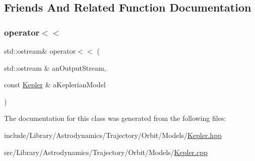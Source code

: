 \subsection{Friends And Related Function Documentation}
\mbox{\label{classlibrary_1_1astro_1_1trajectory_1_1orbit_1_1models_1_1_kepler_aedb386ce32716dfb187f89b52b023f2b}} 
\subsubsection{\texorpdfstring{operator$<$$<$}{operator<<}}
{\footnotesize\ttfamily std\+::ostream\& operator$<$$<$ (\begin{DoxyParamCaption}\item[{std\+::ostream \&}]{an\+Output\+Stream,  }\item[{const \hyperlink{classlibrary_1_1astro_1_1trajectory_1_1orbit_1_1models_1_1_kepler}{Kepler} \&}]{a\+Keplerian\+Model }\end{DoxyParamCaption})\hspace{0.3cm}{\ttfamily [friend]}}



The documentation for this class was generated from the following files\+:\begin{DoxyCompactItemize}
\item 
include/\+Library/\+Astrodynamics/\+Trajectory/\+Orbit/\+Models/\hyperlink{_kepler_8hpp}{Kepler.\+hpp}\item 
src/\+Library/\+Astrodynamics/\+Trajectory/\+Orbit/\+Models/\hyperlink{_kepler_8cpp}{Kepler.\+cpp}\end{DoxyCompactItemize}
